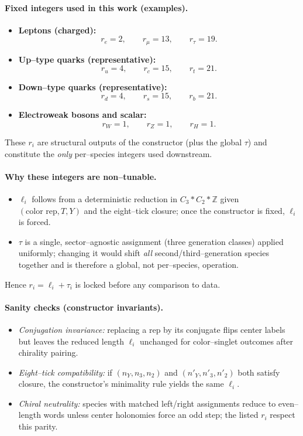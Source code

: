 \documentclass[epjc3]{svjour3}
\begin{document}
\paragraph{Fixed integers used in this work (examples).}
\begin{itemize}
  \item \textbf{Leptons (charged):}
  \[
  r_e=2,\qquad r_\mu=13,\qquad r_\tau=19.
  \]
  \item \textbf{Up–type quarks (representative):}
  \[
  r_u=4,\qquad r_c=15,\qquad r_t=21.
  \]
  \item \textbf{Down–type quarks (representative):}
  \[
  r_d=4,\qquad r_s=15,\qquad r_b=21.
  \]
  \item \textbf{Electroweak bosons and scalar:}
  \[
  r_W=1,\qquad r_Z=1,\qquad r_H=1.
  \]
\end{itemize}
These $r_i$ are structural outputs of the constructor (plus the global $\tau$) and constitute the \emph{only} per–species integers used downstream.

\paragraph{Why these integers are non–tunable.}
\begin{itemize}
  \item $\ell_i$ follows from a deterministic reduction in $C_3 * C_2 * \mathbb Z$ given $(\text{color rep},T,Y)$ and the eight–tick closure; once the constructor is fixed, $\ell_i$ is forced.
  \item $\tau$ is a single, sector–agnostic assignment (three generation classes) applied uniformly; changing it would shift \emph{all} second/third–generation species together and is therefore a global, not per–species, operation.
\end{itemize}
Hence $r_i=\ell_i+\tau_i$ is locked before any comparison to data.

\paragraph{Sanity checks (constructor invariants).}
\begin{itemize}
  \item \emph{Conjugation invariance:} replacing a rep by its conjugate flips center labels but leaves the reduced length $\ell_i$ unchanged for color–singlet outcomes after chirality pairing.
  \item \emph{Eight–tick compatibility:} if $(n_Y,n_3,n_2)$ and $(n'_Y,n'_3,n'_2)$ both satisfy closure, the constructor’s minimality rule yields the same $\ell_i$.
  \item \emph{Chiral neutrality:} species with matched left/right assignments reduce to even–length words unless center holonomies force an odd step; the listed $r_i$ respect this parity.
\end{itemize}
\end{document}
